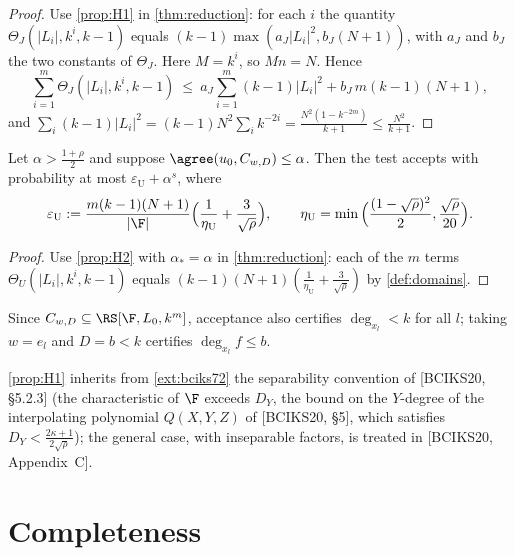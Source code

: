 {{\begin{proof}
Use \ref{prop:H1} in \ref{thm:reduction}: for each $i$ the quantity
$\Theta_J(|L_i|,k^i,k-1)$ equals $(k-1)\max(a_J|L_i|^2,b_J(N+1))$, with $a_J$ and $b_J$ the two
constants of $\Theta_J$. Here $M=k^i$, so $Mn=N$. Hence
\[
\sum_{i=1}^{m}\Theta_J(|L_i|,k^i,k-1)\ \le\ a_J\sum_{i=1}^{m}(k-1)|L_i|^2+b_J\,m(k-1)(N+1),
\]
and $\sum_i(k-1)|L_i|^2=(k-1)N^2\sum_ik^{-2i}=\frac{N^2(1-k^{-2m})}{k+1}\le\frac{N^2}{k+1}$.
\end{proof}

\begin{consequence}\label{cor:ud}
Let $\alpha>\frac{1+\rho}2$ and suppose $\agree(u_0,C_{w,D})\le\alpha$. Then the test accepts
with probability at most $\varepsilon_{\mathrm U}+\alpha^s$, where
\[
\varepsilon_{\mathrm U}:=\frac{m(k-1)(N+1)}{|\F|}\Big(\frac1{\eta_{\mathrm U}}+\frac3{\sqrt\rho}\Big),
\qquad \eta_{\mathrm U}=\min\Big(\frac{(1-\sqrt\rho)^2}2,\frac{\sqrt\rho}{20}\Big).
\]
\end{consequence}

\begin{proof}
Use \ref{prop:H2} with $\alpha_*=\alpha$ in \ref{thm:reduction}: each of the $m$ terms
$\Theta_U(|L_i|,k^i,k-1)$ equals $(k-1)(N+1)(\frac1{\eta_{\mathrm U}}+\frac3{\sqrt\rho})$ by \ref{def:domains}.
\end{proof}

\begin{remark}
Since $C_{w,D}\subseteq\RS[\F,L_0,k^m]$, acceptance also certifies $\deg_{x_l}<k$ for all $l$;
taking $w=e_l$ and $D=b<k$ certifies $\deg_{x_l}f\le b$.
\end{remark}

\begin{remark}[Characteristic]\label{rem:char}\notready{}
\ref{prop:H1} inherits from \ref{ext:bciks72} the separability convention of
[BCIKS20, \S5.2.3] (the characteristic of $\F$ exceeds $D_Y$, the bound on the $Y$-degree of the interpolating polynomial $Q(X,Y,Z)$ of [BCIKS20, \S5], which satisfies $D_Y<\frac{2\kappa+1}{2\sqrt\rho}$); the
general case, with inseparable factors, is treated in [BCIKS20, Appendix~C].
\end{remark}

\section{Completeness}

}}
